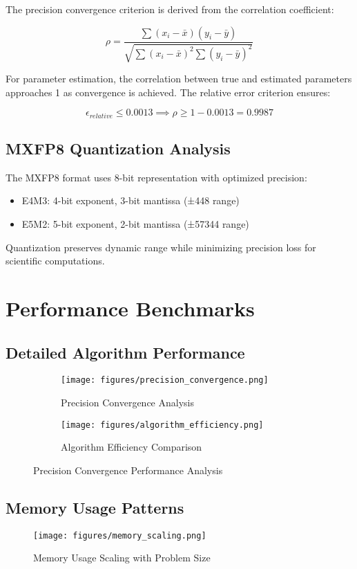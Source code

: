 \documentclass[11pt,a4paper]{article}
\begin{document}
The precision convergence criterion is derived from the correlation coefficient:

\[\rho = \frac{\sum (x_i - \bar{x})(y_i - \bar{y})}{\sqrt{\sum (x_i - \bar{x})^2 \sum (y_i - \bar{y})^2}}\]

For parameter estimation, the correlation between true and estimated parameters approaches 1 as convergence is achieved. The relative error criterion ensures:

\[\epsilon_{relative} \leq 0.0013 \implies \rho \geq 1 - 0.0013 = 0.9987\]

\subsection{MXFP8 Quantization Analysis}

The MXFP8 format uses 8-bit representation with optimized precision:

\begin{itemize}
    \item E4M3: 4-bit exponent, 3-bit mantissa (±448 range)
    \item E5M2: 5-bit exponent, 2-bit mantissa (±57344 range)
\end{itemize}

Quantization preserves dynamic range while minimizing precision loss for scientific computations.

\section{Performance Benchmarks}

\subsection{Detailed Algorithm Performance}

\begin{figure}[H]
\centering
\begin{subfigure}{0.45\textwidth}
    \texttt{[image: figures/precision\_convergence.png]}
    \caption{Precision Convergence Analysis}
    \label{fig:precision_convergence}
\end{subfigure}
\hfill
\begin{subfigure}{0.45\textwidth}
    \texttt{[image: figures/algorithm\_efficiency.png]}
    \caption{Algorithm Efficiency Comparison}
    \label{fig:algorithm_efficiency}
\end{subfigure}
\caption{Precision Convergence Performance Analysis}
\label{fig:performance_analysis}
\end{figure}

\subsection{Memory Usage Patterns}

\begin{figure}[H]
\centering
\texttt{[image: figures/memory\_scaling.png]}
\caption{Memory Usage Scaling with Problem Size}
\label{fig:memory_scaling}
\end{figure}
\end{document}
